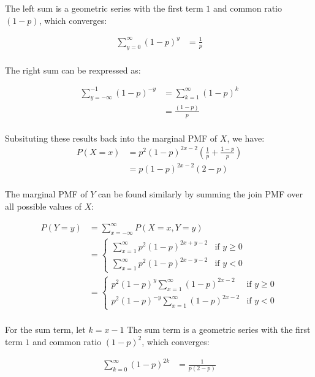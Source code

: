 \documentclass[12pt]{article}
\begin{document}
\begin{enumerate}
\begin{enumerate}
The left sum is a geometric series with the first term $1$ and common ratio $(1-p)$, which converges:

\begin{align*}
\sum_{y=0}^{\infty} (1-p)^{y} &= \frac{1}{p} \\
\end{align*}

The right sum can be rexpressed as:

\begin{align*}
\sum_{y=-\infty}^{-1} (1-p)^{-y} &= \sum_{k=1}^{\infty} (1-p)^{k} \\
&= \frac{(1-p)}{p} \\
\end{align*}

Subsituting these results back into the marginal PMF of $X$, we have:
\begin{align*}
P(X=x) &= p^2(1-p)^{2x-2} \left(\frac{1}{p} + \frac{1-p}{p}\right) \\
&= p(1-p)^{2x-2} \left( 2-p \right) \\
\end{align*}

The marginal PMF of $Y$ can be found similarly by summing the join PMF over all possible values of $X$:

\begin{align*}
P(Y=y) &= \sum_{x=-\infty}^{\infty} P(X=x, Y=y) \\
&= \begin{cases}
\sum_{x=1}^{\infty} p^2(1-p)^{2x+y-2} & \text{if } y \geq 0 \\
\sum_{x=1}^{\infty} p^2(1-p)^{2x-y-2} & \text{if } y < 0
\end{cases}	\\
&= \begin{cases}
	p^2(1-p)^{y} \sum_{x=1}^{\infty} (1-p)^{2x-2} & \text{if } y \geq 0 \\
	p^2(1-p)^{-y} \sum_{x=1}^{\infty} (1-p)^{2x-2} & \text{if } y < 0
\end{cases} \\
\end{align*}

For the sum term, let $k=x-1$ The sum term is a geometric series with the first term $1$ and common ratio $(1-p)^2$, which converges:

\begin{align*}
\sum_{k=0}^{\infty} (1-p)^{2k} &= \frac{1}{p(2-p)} \\
\end{align*}


\end{enumerate}
\end{enumerate}
\end{document}
